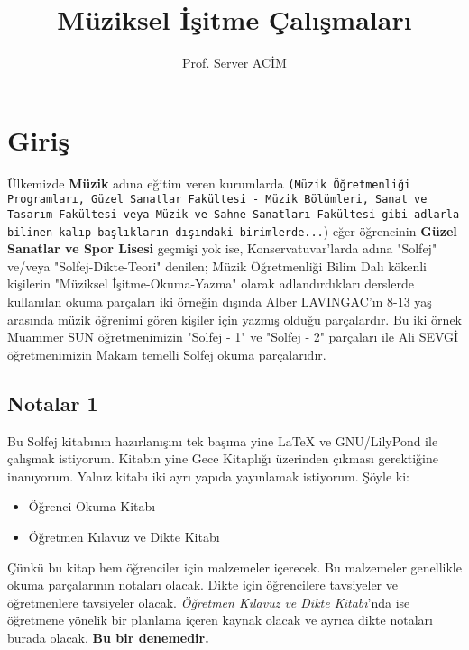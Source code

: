 \documentclass[a4paper,12pt]{book}
\title{Müziksel İşitme Çalışmaları}
\author{Prof. Server ACİM}
\begin{document}
\maketitle
\tableofcontents


\chapter{Giriş}
Ülkemizde \textbf{Müzik} adına eğitim veren kurumlarda \texttt{(Müzik Öğretmenliği Programları, Güzel Sanatlar Fakültesi - Müzik Bölümleri, Sanat ve Tasarım Fakültesi veya Müzik ve Sahne Sanatları Fakültesi gibi adlarla bilinen kalıp başlıkların dışındaki birimlerde...}) eğer öğrencinin \textbf{Güzel Sanatlar ve Spor Lisesi} geçmişi yok ise, Konservatuvar'larda adına "Solfej" ve/veya "Solfej-Dikte-Teori" denilen; Müzik Öğretmenliği Bilim Dalı kökenli kişilerin "Müziksel İşitme-Okuma-Yazma" olarak adlandırdıkları derslerde kullanılan okuma parçaları iki örneğin dışında Alber LAVINGAC'ın 8-13 yaş arasında müzik öğrenimi gören kişiler için yazmış olduğu parçalardır. Bu iki örnek Muammer SUN öğretmenimizin "Solfej - 1" ve "Solfej - 2" parçaları ile Ali SEVGİ öğretmenimizin Makam temelli Solfej okuma parçalarıdır. 



\section{Notalar 1}
Bu Solfej kitabının hazırlanışını tek başıma yine LaTeX ve GNU/LilyPond ile çalışmak istiyorum. Kitabın yine Gece Kitaplığı üzerinden çıkması gerektiğine inanıyorum. Yalnız kitabı iki ayrı yapıda yayınlamak istiyorum. Şöyle ki:

\begin{itemize}
  \item Öğrenci Okuma Kitabı
  \item Öğretmen Kılavuz ve Dikte Kitabı
\end{itemize}

Çünkü bu kitap hem öğrenciler için malzemeler içerecek. Bu malzemeler genellikle okuma parçalarının notaları olacak. Dikte için öğrencilere tavsiyeler ve öğretmenlere tavsiyeler olacak. \textit{Öğretmen Kılavuz ve Dikte Kitabı}'nda ise öğretmene yönelik bir planlama içeren kaynak olacak ve ayrıca dikte notaları burada olacak. \textbf{Bu bir denemedir.}
\end{document}

